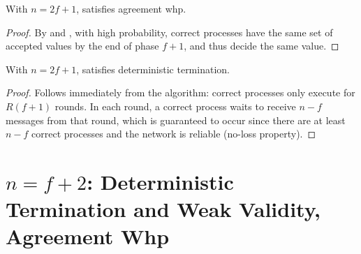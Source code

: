 \begin{theorem}\label{thm:2f+1-agreement}
    With $n=2f+1$,  satisfies agreement whp.
\end{theorem}
\begin{proof}
    By  and , with high probability, correct processes have the same set of accepted values by the end of phase $f+1$, and thus decide the same value.
\end{proof}

\begin{theorem}
    With $n=2f+1$,  satisfies deterministic termination.
\end{theorem}
\begin{proof}
    Follows immediately from the algorithm: correct processes only execute for $R(f+1)$ rounds. In each round, a correct process waits to receive $n-f$ messages from that round, which is guaranteed to occur since there are at least $n-f$ correct processes and the network is reliable (no-loss property).
\end{proof}




\section{$n = f+2$: Deterministic Termination and Weak Validity, Agreement Whp}

